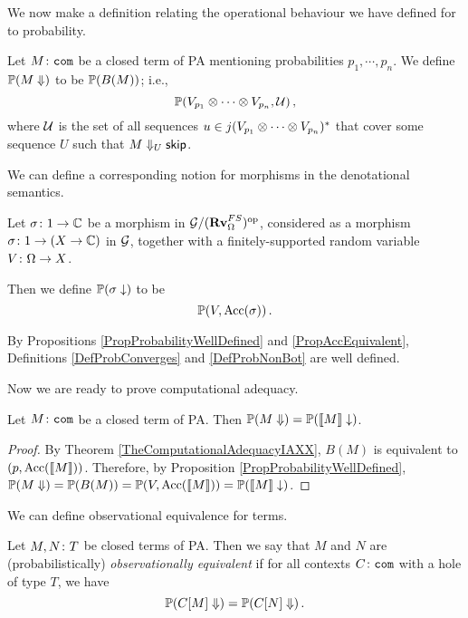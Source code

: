 \documentclass{report}[11pt]
\begin{document}
We now make a definition relating the operational behaviour we have defined for \IAXX to probability.

\begin{definition}
  Let $M\colon {\mathtt{com}}$ be a closed term of PA mentioning probabilities $p_1,\cdots,p_n$.
  We define $\mathbb{P}(M\Downarrow)$ to be $\mathbb{P}(B(M))$; i.e.,
  \[
    \mathbb{P}(V_{p_1}\otimes \cdots \otimes V_{p_n},\mathcal U)\,,
    \]
  where $\mathcal U$ is the set of all sequences $u\in j(V_{p_1}\otimes \cdots \otimes V_{p_n})^*$ that cover some sequence $U$ such that $M\Downarrow_U{\mathsf{skip}}$.
  \label{DefProbConverges}
\end{definition}

We can define a corresponding notion for morphisms in the denotational semantics.

\begin{definition}
  Let $\sigma \colon 1 \to \mathbb{C}$ be a morphism in $\mathcal G/({\normalfont\textbf{Rv}}_\Omega^{FS})^{\mathrm{op}}$, considered as a morphism $\sigma \colon 1 \to (X \to \mathbb{C})$ in $\mathcal G$, together with a finitely-supported random variable $V \colon \Omega \to X$.  

  Then we define $\mathbb{P}(\sigma\downarrow)$ to be
  \[
    \mathbb{P}(V, \operatorname{Acc}(\sigma))\,.
    \]
  \label{DefProbNonBot}
\end{definition}

\begin{remark}
  By Propositions \ref{PropProbabilityWellDefined} and \ref{PropAccEquivalent}, Definitions \ref{DefProbConverges} and \ref{DefProbNonBot} are well defined.
\end{remark}

Now we are ready to prove computational adequacy.

\begin{proposition}
  Let $M\colon {\mathtt{com}}$ be a closed term of PA.  
  Then $\mathbb{P}(M\Downarrow) = \mathbb{P}(\left\llbracket M\right\rrbracket \downarrow)$.
  \label{PropComputationalAdequacyPa}
\end{proposition}
\begin{proof}
  By Theorem \ref{TheComputationalAdequacyIAXX}, $B(M)$ is equivalent to $(p,\operatorname{Acc}(\left\llbracket M\right\rrbracket))$.  
  Therefore, by Proposition \ref{PropProbabilityWellDefined}, $\mathbb{P}(M\Downarrow) = \mathbb{P}(B(M)) = \mathbb{P}(V,\operatorname{Acc}(\left\llbracket M\right\rrbracket)) = \mathbb{P}(\left\llbracket M\right\rrbracket\downarrow)$.
\end{proof}

We can define observational equivalence for terms.

\begin{definition}
  Let $M,N\colon T$ be closed terms of PA.  
  Then we say that $M$ and $N$ are (probabilistically) \emph{observationally equivalent} if for all contexts $C\colon {\mathtt{com}}$ with a hole of type $T$, we have
  \[
    \mathbb{P}(C[M]\Downarrow) = \mathbb{P}(C[N]\Downarrow)\,.
    \]
\end{definition}
\end{document}
